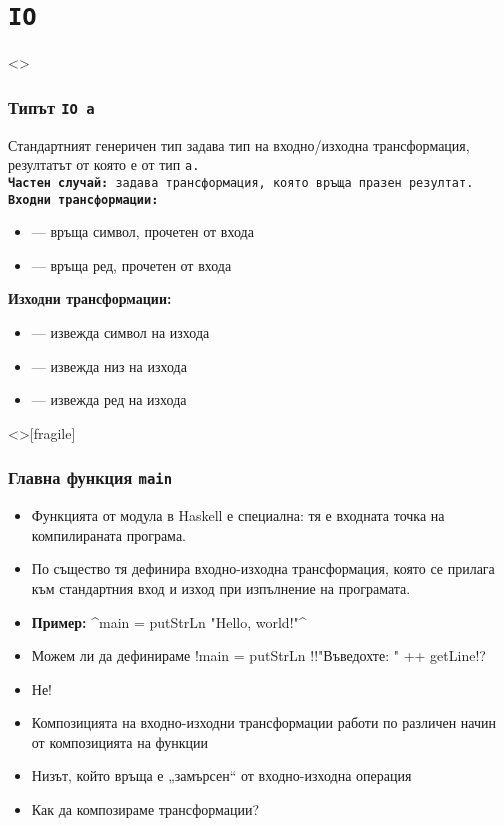 \documentclass[alsotrans,beameroptions={aspectratio=169}]{beamerswitch}
\begin{document}
\section{\tt{IO}}

\begin{frame}<>
  \frametitle{Типът \tt{IO a}}

  Стандартният генеричен тип  задава тип на входно/изходна трансформация, резултатът от която е от тип \tt{a}.\\
  \pause
  \textbf{Частен случай:}  задава трансформация, която връща празен резултат.\\[2ex]
  \pause
  \textbf{Входни трансформации:}
  \begin{itemize}
  \item {} --- връща символ, прочетен от входа
  \item {} --- връща ред, прочетен от входа
  \end{itemize}
  \pause
  \textbf{Изходни трансформации:}
  \begin{itemize}
  \item {} --- извежда символ на изхода
  \item {} --- извежда низ на изхода
  \item {} --- извежда ред на изхода
  \end{itemize}
\end{frame}

\begin{frame}<>[fragile]
  \frametitle{Главна функция \tt{main}}

  \begin{itemize}[<+->]
  \item Функцията  от модула  в Haskell е
    специална: тя е входната точка на компилираната програма.
  \item По същество тя дефинира входно-изходна трансформация, която се прилага към стандартния вход и изход при изпълнение на програмата.
  \item \textbf{Пример:} \lst^main = putStrLn "Hello, world!"^
  \item Можем ли да дефинираме \lst!main = putStrLn !\lst!"Въведохте: " ++ getLine!? %
  \item \alert{Не!} \hspace{3em}  
  \item Композицията на входно-изходни трансформации работи по различен начин от композицията на функции
  \item Низът, който връща  е „замърсен“ от входно-изходна операция
  \item Как да композираме трансформации?
  \end{itemize}
\end{frame}
\end{document}
